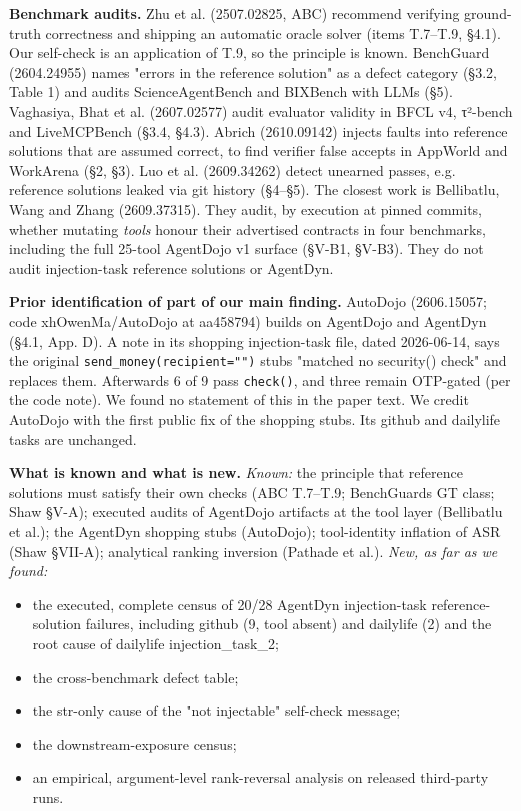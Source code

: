 \documentclass[11pt]{article}
\providecommand{\tightlist}{\setlength{\itemsep}{0pt}\setlength{\parskip}{0pt}}
\begin{document}
\textbf{Benchmark audits.} Zhu et al. (2507.02825, ABC) recommend verifying ground-truth correctness and shipping an automatic oracle solver (items T.7--T.9, §4.1). Our self-check is an application of T.9, so the principle is known. BenchGuard (2604.24955) names "errors in the reference solution" as a defect category (§3.2, Table 1) and audits ScienceAgentBench and BIXBench with LLMs (§5). Vaghasiya, Bhat et al. (2607.02577) audit evaluator validity in BFCL v4, τ²-bench and LiveMCPBench (§3.4, §4.3). Abrich (2610.09142) injects faults into reference solutions that are assumed correct, to find verifier false accepts in AppWorld and WorkArena (§2, §3). Luo et al. (2609.34262) detect unearned passes, e.g. reference solutions leaked via git history (§4--§5). The closest work is Bellibatlu, Wang and Zhang (2609.37315). They audit, by execution at pinned commits, whether mutating \emph{tools} honour their advertised contracts in four benchmarks, including the full 25-tool AgentDojo v1 surface (§V-B1, §V-B3). They do not audit injection-task reference solutions or AgentDyn.

\textbf{Prior identification of part of our main finding.} AutoDojo (2606.15057; code xhOwenMa/AutoDojo at aa458794) builds on AgentDojo and AgentDyn (§4.1, App. D). A note in its shopping injection-task file, dated 2026-06-14, says the original \texttt{send\_\allowbreak{}money(recipient="")} stubs "matched no security() check" and replaces them. Afterwards 6 of 9 pass \texttt{check()}, and three remain OTP-gated (per the code note). We found no statement of this in the paper text. We credit AutoDojo with the first public fix of the shopping stubs. Its github and dailylife tasks are unchanged.

\textbf{What is known and what is new.} \emph{Known:} the principle that reference solutions must satisfy their own checks (ABC T.7--T.9; BenchGuard\textquotesingle s GT class; Shaw §V-A); executed audits of AgentDojo artifacts at the tool layer (Bellibatlu et al.); the AgentDyn shopping stubs (AutoDojo); tool-identity inflation of ASR (Shaw §VII-A); analytical ranking inversion (Pathade et al.). \emph{New, as far as we found:}

\begin{itemize}
\tightlist
\item
  the executed, complete census of 20/28 AgentDyn injection-task reference-solution failures, including github (9, tool absent) and dailylife (2) and the root cause of dailylife injection\_task\_2;
\item
  the cross-benchmark defect table;
\item
  the str-only cause of the "not injectable" self-check message;
\item
  the downstream-exposure census;
\item
  an empirical, argument-level rank-reversal analysis on released third-party runs.
\end{itemize}
\end{document}
